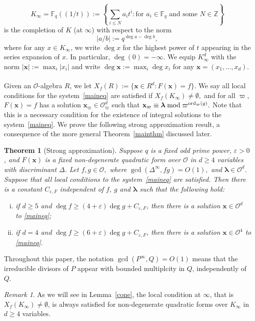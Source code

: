 \documentclass[10pt]{amsart}
\theoremstyle{plain}
\theoremstyle{plain}
\newtheorem{theorem}{Theorem}[section]
\renewcommand{\vec}[1]{\mathbf{#1}}
\theoremstyle{remark}
\newtheorem{remark}[equation]{Remark}
\theoremstyle{definition}
\newcommand{\ord}{\textup{ord}}
\newcommand{\Ki}{K_\infty}
\newcommand{\FF}{\mathbb{F}}
\newcommand{\ZZ}{\mathbb{Z}}
\begin{document}
\[\Ki=\mathbb{F}_q(\!(1/t)\!):=\left\{\sum_{i\leq N}a_it^i: \mbox{for $a_i\in \FF_q$ and some $N\in\ZZ$} \right\}
\] 
is the completion of $K$ (at $\infty$) with respect to the norm
\[|a/b|:=q^{\deg a-\deg b},\]
where for any $x\in\Ki$, we write $\deg x$ for the highest power of $t$ appearing in  the series expansion of $x$. In particular, $\deg(0)=-\infty.$ We equip $K_{\infty}^d$ with the norm $|\vec{x}|:=\max_i|x_i|$ and write $\deg\vec{x} :=\max_i \deg x_i$ for any $\vec{x}=(x_1,\hdots,x_d).$\\
\\
Given an $\mathcal{O}$-algebra $R$, we let $X_f(R):=\{\vec{x}\in R^d: F(\vec{x})=f\}$. We say all local conditions for the system~\eqref{maineq} are satisfied if $X_f(\Ki)\neq\emptyset,$ and for all $\varpi$, $F(\vec{x})=f$ has a
solution $\vec{x}_{\varpi} \in  \mathcal{O}_{\varpi}^d$ such that $\vec{x}_{\varpi}\equiv\boldsymbol{\lambda}\bmod \varpi^{\ord_{\varpi}(g)}.$ Note that this is a necessary condition for the existence of integral solutions to the system~\eqref{maineq}. We prove the following strong approximation result, a consequence of the more general Theorem~\ref{mainthm} discussed later.
\begin{theorem}[Strong approximation]\label{strong}
Suppose $q$ is a fixed odd prime power, $\varepsilon>0$, and  $F(\vec{x})$ is a fixed non-degenerate quadratic form over $\mathcal{O}$ in $d\geq 4$ variables with discriminant $\Delta$. Let $f, g\in\mathcal{O},$ where $\gcd(\Delta^{\infty},fg)=O(1),$ and  $\boldsymbol{\lambda}\in\mathcal{O}^d.$  Suppose that  all local conditions to the system~\eqref{maineq} are satisfied.  Then there is a constant $C_{\varepsilon,F}$ independent of $f$,  $g$ and $\boldsymbol{\lambda}$ such that the following hold:
\\
\begin{enumerate}[(i)]
\item if $d\geq 5$  and $\deg f \geq (4+\varepsilon)\deg g +C_{\varepsilon,F}$, then  there is a solution $\vec{x} \in \mathcal{O}^d $ to \eqref{maineq};
\\
\item if $d=4$ and $\deg f \geq (6+\varepsilon)\deg g +C_{\varepsilon,F}$, then  there is a solution $\vec{x} \in \mathcal{O}^4 $ to \eqref{maineq}.
\end{enumerate}
\end{theorem}
Throughout this paper, the notation $\gcd(P^{\infty},Q)=O(1)$ means that the irreducible divisors of $P$ appear with bounded multiplcity in $Q$, independently of $Q$.
\begin{remark}
 As we will see in Lemma~\ref{cone}, the local condition at $\infty$, that is $X_f(\Ki)\neq\emptyset$, is always satisfied for non-degenerate quadratic forms over $\Ki$ in $d\geq 4$ variables.
\end{remark}
\end{document}
